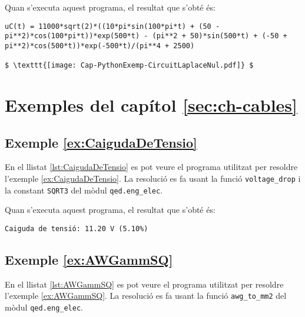 


Quan s'executa aquest programa, el resultat que s'obté és:
\lstset{
	language=,
	numbers=none,
	frame=none
}
\begin{lstlisting}[mathescape=true]
uC(t) = 11000*sqrt(2)*((10*pi*sin(100*pi*t) + (50 - pi**2)*cos(100*pi*t))*exp(500*t) - (pi**2 + 50)*sin(500*t) + (-50 + pi**2)*cos(500*t))*exp(-500*t)/(pi**4 + 2500)

$ \texttt{[image: Cap-PythonExemp-CircuitLaplaceNul.pdf]} $
\end{lstlisting} 



\section{Exemples del capítol \ref*{sec:ch-cables}}

\hypertarget{exemple:CaigudaDeTensio}{\subsection{Exemple \ref*{ex:CaigudaDeTensio} \CaigudaDeTensio}}
En el llistat \vref{lst:CaigudaDeTensio} es pot veure el programa utilitzat per resoldre l'exemple \vref{ex:CaigudaDeTensio}. La resolució es fa usant la funció \texttt{voltage\_drop} i la constant \texttt{SQRT3} del mòdul \texttt{qed.eng\_elec}.


Quan s'executa aquest programa, el resultat que s'obté és:
\lstset{
	language=,
	numbers=none,
	frame=none
}
\begin{lstlisting}
Caiguda de tensió: 11.20 V (5.10%)
\end{lstlisting} 



\hypertarget{exemple:AWGammSQ}{\subsection{Exemple \ref*{ex:AWGammSQ} \AWGammSQ}}
En el llistat \vref{lst:AWGammSQ} es pot veure el programa utilitzat per resoldre l'exemple \vref{ex:AWGammSQ}. La resolució es fa usant la funció \texttt{awg\_to\_mm2} del mòdul \texttt{qed.eng\_elec}.


